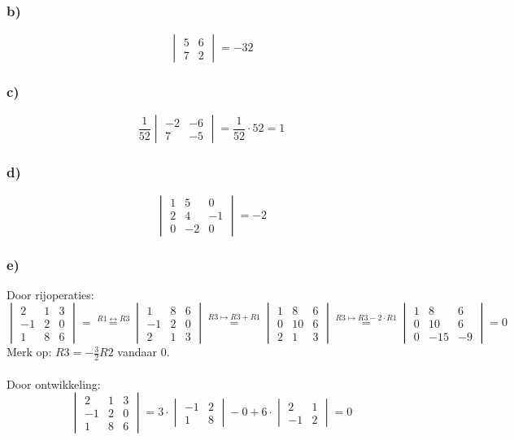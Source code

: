 \documentclass[lineaire_algebra_oplossingen.tex]{subfiles}
\begin{document}
\subsubsection*{b)}
\[
\begin{vmatrix}
5 & 6\\
7 & 2
\end{vmatrix}
= -32
\]
\subsubsection*{c)}
\[
    \frac{1}{52} \begin{vmatrix}
        -2 & -6\\
        7 & -5
    \end{vmatrix} 
    = \frac{1}{52} \cdot 52 = 1
\]
\subsubsection*{d)}
\[
\begin{vmatrix}
1 & 5 & 0\\
2 & 4 & -1\\
0 & -2 & 0
\end{vmatrix}
= -2
\]
\subsubsection*{e)}
Door rijoperaties:
$$
\begin{vmatrix}
2 & 1 & 3\\
-1 & 2 & 0\\
1 & 8 & 6
\end{vmatrix}
=
\overset{R1 \leftrightarrow R3}{=}
\begin{vmatrix}
1 & 8 & 6\\
-1 & 2 & 0\\
2 & 1 & 3
\end{vmatrix}
\overset{R3 \longmapsto R3 + R1}{=}
\begin{vmatrix}
1 & 8 & 6\\
0 & 10 & 6\\
2 & 1 & 3
\end{vmatrix}
\overset{R3 \longmapsto R3 - 2\cdot R1}{=}
\begin{vmatrix}
1 & 8 & 6\\
0 & 10 & 6\\
0 & -15 & -9
\end{vmatrix}
= 0
$$
Merk op: $R3 = -\frac{3}{2} R2$ vandaar $0$.\\
\\
Door ontwikkeling:
$$
\begin{vmatrix}
2 & 1 & 3\\
-1 & 2 & 0\\
1 & 8 & 6
\end{vmatrix}
=
3 \cdot
\begin{vmatrix}
-1 & 2\\
1 & 8
\end{vmatrix}
-0
+6 \cdot
\begin{vmatrix}
2 & 1\\
-1 & 2
\end{vmatrix}
= 0
$$
\end{document}
